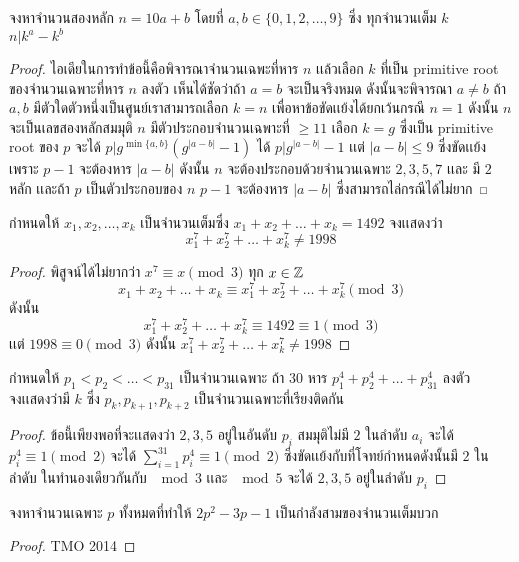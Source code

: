 \documentclass[a4paper,12pt]{scrartcl}
\begin{document}
	\begin{example}
		จงหาจำนวนสองหลัก $n = 10a+b$ โดยที่ $a,b \in \{ 0,1,2,\dots , 9 \}$ ซึ่ง ทุกจำนวนเต็ม $k$\\ $n | k^a-k^b$
	\end{example}
\begin{proof} ไอเดียในการทำข้อนี้คือพิจารณาจำนวนเฉพะที่หาร $n$ เเล้วเลือก $k$ ที่เป็น primitive root  \\ ของจำนวนเฉพาะที่หาร $n$ ลงตัว เห็นได้ชัดว่าถ้า $a=b$ จะเป็นจริงหมด ดังนั้นจะพิจารณา $a\neq b$
ถ้า $a,b$ มีตัวใดตัวหนึ่งเป็นศูนย์เราสามารถเลือก $k=n$ เพื่อหาข้อขัดเเย้งได้ยกเว้นกรณี $n=1$ ดังนั้น $n$ จะเป็นเลขสองหลักสมมุติ $n$ มีตัวประกอบจำนวนเฉพาะที่ $\ge 11$ เลือก $k = g$ ซึ่งเป็น primitive root ของ $p$ จะได้ $p|g^{\min\{a,b \}}(g^{|a-b|}-1)$ ได้ $p |g^{|a-b|}-1$ เเต่ $|a-b| \le 9$ ซึ่งขัดเเย้งเพราะ $p-1$ จะต้องหาร $|a-b|$ ดังนั้น $n$ จะต้องประกอบด้วยจำนวนเฉพาะ $2,3,5,7$ เเละ มี $2$ หลัก เเละถ้า $p$ เป็นตัวประกอบของ $n$ $p-1$ จะต้องหาร $|a-b|$  ซึ่งสามารถไล่กรณีได้ไม่ยาก  
\end{proof}
	\begin{example}
		กำหนดให้ $x_1,x_2,\dots,x_k$ เป็นจำนวนเต็มซึ่ง $x_1+x_2+\dots+x_k = 1492$ จงเเสดงว่า \[ x_1^7+x_2^7+\dots+x_k^7 \neq 1998 \]
	\end{example}
\begin{proof}
	พิสูจน์ได้ไม่ยากว่า $x^7 \equiv x \pmod 3$ 	ทุก $x \in \mathbb Z$ \[ x_1+x_2+\dots+x_k \equiv x_1^7+x_2^7+\dots+x_k^7 \pmod 3 \] ดังนั้น \[x_1^7+x_2^7+\dots+x_k^7 \equiv 1492 \equiv 1 \pmod 3\] เเต่ $1998 \equiv 0 \pmod 3$ ดังนั้น $x_1^7+x_2^7+\dots+x_k^7 \neq 1998$
\end{proof}
	\begin{example}
			กำหนดให้ $p_1<p_2<\dots<p_{31}$ เป็นจำนวนเฉพาะ ถ้า $30$ หาร  $p_1^4+p_2^4+\dots+p_{31}^4$ ลงตัว \\ จงเเสดงว่ามี $k$ ซึ่ง $p_k,p_{k+1},p_{k+2}$ เป็นจำนวนเฉพาะที่เรียงติดกัน
	\end{example}
	\begin{proof}
		ข้อนี้เพียงพอที่จะเเสดงว่า $2,3,5$ อยู่ในอันดับ $p_i$ สมมุติไม่มี $2$ ในลำดับ $a_i$ จะได้ $p_i^4 \equiv 1 \pmod 2$ จะได้ $ \sum_{i=1}^{31} p_i^4 \equiv 1 \pmod 2$ ซึ่งขัดเเย้งกับที่โจทย์กำหนดดังนั้นมี $2$ ในลำดับ ในทำนองเดียวกันกับ $\mod 3$ เเละ $\mod 5$ จะได้ $2,3,5$ อยู่ในลำดับ $p_i$
	\end{proof}
	\begin{example}
		จงหาจำนวนเฉพาะ $p$ ทั้งหมดที่ทำให้ $2p^2-3p-1$ เป็นกำลังสามของจำนวนเต็มบวก
	\end{example}
\begin{proof}
	TMO 2014
\end{proof}
\end{document}

